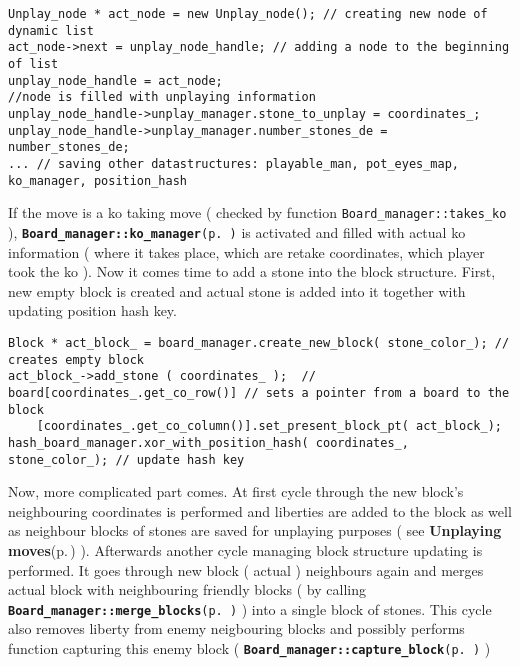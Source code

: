 \footnotesize\begin{verbatim}Unplay_node * act_node = new Unplay_node(); // creating new node of dynamic list 
act_node->next = unplay_node_handle; // adding a node to the beginning of list
unplay_node_handle = act_node;
//node is filled with unplaying information
unplay_node_handle->unplay_manager.stone_to_unplay = coordinates_;  
unplay_node_handle->unplay_manager.number_stones_de = number_stones_de;
... // saving other datastructures: playable_man, pot_eyes_map, ko_manager, position_hash
\end{verbatim}
\normalsize


If the move is a ko taking move ( checked by function {\tt Board\_\-manager::takes\_\-ko} ), {\tt {\bf Board\_\-manager::ko\_\-manager}{\rm (p.\,\pageref{classBoard__manager_o3})}} is activated and filled with actual ko information ( where it takes place, which are retake coordinates, which player took the ko ). Now it comes time to add a stone into the block structure. First, new empty block is created and actual stone is added into it together with updating position hash key. 

\footnotesize\begin{verbatim}Block * act_block_ = board_manager.create_new_block( stone_color_); // creates empty block
act_block_->add_stone ( coordinates_ );  // 
board[coordinates_.get_co_row()] // sets a pointer from a board to the block
    [coordinates_.get_co_column()].set_present_block_pt( act_block_); 
hash_board_manager.xor_with_position_hash( coordinates_, stone_color_); // update hash key 
\end{verbatim}
\normalsize


Now, more complicated part comes. At first cycle through the new block's neighbouring coordinates is performed and liberties are added to the block as well as neighbour blocks of stones are saved for unplaying purposes ( see {\bf Unplaying moves}{\rm (p.\,\pageref{page_6_page_6__sec_4})} ). Afterwards another cycle managing block structure updating is performed. It goes through new block ( actual ) neighbours again and merges actual block with neighbouring friendly blocks ( by calling {\tt {\bf Board\_\-manager::merge\_\-blocks}{\rm (p.\,\pageref{classBoard__manager_a5})}} ) into a single block of stones. This cycle also removes liberty from enemy neigbouring blocks and possibly performs function capturing this enemy block ( {\tt {\bf Board\_\-manager::capture\_\-block}{\rm (p.\,\pageref{classBoard__manager_a2})}} ) 


